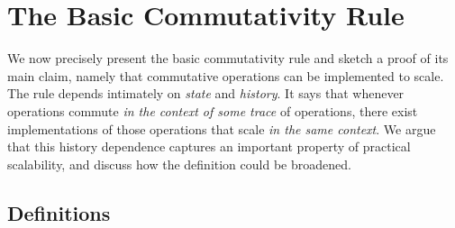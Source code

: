 
\section{The Basic Commutativity Rule}
\label{sec:rule}

We now precisely present the basic commutativity rule and sketch a
proof of its main claim, namely that commutative operations can be
implemented to scale.
%
The rule depends intimately on \emph{state} and \emph{history}.
%
It says that whenever operations commute \emph{in the context of some
trace} of operations, there exist implementations of those operations
that scale \emph{in the same context}.
%
We argue that this history dependence captures an important property of
practical scalability, and discuss how the definition could be
broadened.

\begin{comment}
To give a sense for how the connection between commutativity and
scalability might be formalized, this section provides a preliminary
definition of scalability, commutativity, and a rule that connects the
two.  While this makes our proposal more concrete, we hope to further
improve on these definitions and rules to make them easier to apply
in practice.

In this section, we start by first defining an abstract machine designed
to capture the primary factors in scalability on real hardware.
Then, we define commutativity in a way
that applies well to system calls with state-dependent behavior.  Finally,
our hypothesis connects the commutativity of interfaces with the
existence of implementations that scale linearly on the abstract
machine.
\end{comment}

\subsection{Definitions}
\label{pf}

\def\OP#1{\textsl{#1}}
\def\INV#1#2#3{\text{\OP{#1}}_{#3}(#2)}
\def\RES#1#2#3{\text{\OP{#1}}_{#3} \rightarrow #2}
\def\HRESTRICT#1#2{#1|#2}
\def\HIST#1{#1}
\def\LEGALHIST{\mathcal{H}}
\def\PARTIALHIST{\mathcal{P}}
\def\STEP{\rightarrow}
\def\TRUE{\textsc{true}}
\def\FALSE{\textsc{false}}
\def\OK{\textsc{ok}}
\def\FAIL{\textsc{fail}}
\def\qed{$\square$}

\begin{comment}
The abstract machine gives us a way to reason about when a particular
implementation scales, which, in turn, lets us weigh potential
implementations of an given interface.
In order to reason about when an interface's implementation \emph{can
  be} scalable, this section turns to \emph{commutativity}, an interface
design property that captures the inherent communication needs of an
interface's implementations.
\end{comment}


